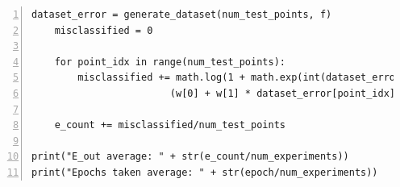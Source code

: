 \documentclass{article}
\begin{document}
\begin{lstlisting}[frame=single,
numbers=left,
style=Matlab-Pyglike]
    dataset_error = generate_dataset(num_test_points, f)
    misclassified = 0
    
    for point_idx in range(num_test_points):
        misclassified += math.log(1 + math.exp(int(dataset_error[point_idx][2]) *  
                        (w[0] + w[1] * dataset_error[point_idx][0] + w[2] * dataset_error[point_idx][1])))
    
    e_count += misclassified/num_test_points
    
print("E_out average: " + str(e_count/num_experiments))
print("Epochs taken average: " + str(epoch/num_experiments))
\end{lstlisting}
\end{document}
